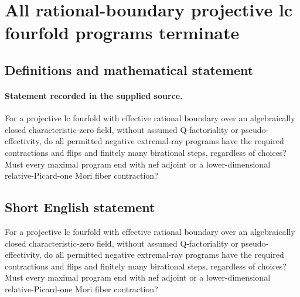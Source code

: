 \documentclass[11pt]{article}
\begin{document}
\section*{All rational-boundary projective lc fourfold programs terminate}\label{statement}
\subsection{Definitions and mathematical statement}
\paragraph{Statement recorded in the supplied source.}
For a projective lc fourfold with effective rational boundary over an algebraically closed characteristic-zero field, without assumed Q-factoriality or pseudo-effectivity, do all permitted negative extremal-ray programs have the required contractions and flips and finitely many birational steps, regardless of choices? Must every maximal program end with nef adjoint or a lower-dimensional relative-Picard-one Mori fiber contraction?
\subsection{Short English statement}
For a projective lc fourfold with effective rational boundary over an algebraically closed characteristic-zero field, without assumed Q-factoriality or pseudo-effectivity, do all permitted negative extremal-ray programs have the required contractions and flips and finitely many birational steps, regardless of choices? Must every maximal program end with nef adjoint or a lower-dimensional relative-Picard-one Mori fiber contraction?
\end{document}
